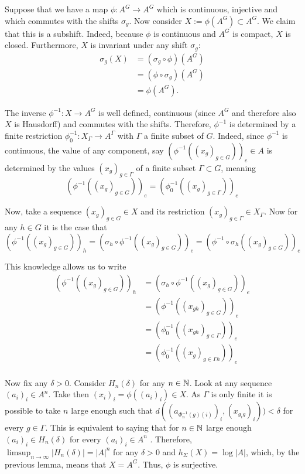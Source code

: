 Suppose that we have a map $\phi: A^G \to A^G$ which is continuous, injective and which commutes with the shifts $\sigma_g$. Now consider $X := \phi(A^G) \subset A^G$. We claim that this is a subshift. Indeed, because $\phi$ is continuous and $A^G$ is compact, $X$ is closed. Furthermore, $X$ is invariant under any shift $\sigma_g$: 
		\begin{align*}
		\sigma_g(X)
		&= (\sigma_g \circ \phi) (A^G) \\
		&= (\phi \circ \sigma_g)(A^G) \\
		&= \phi(A^G).
		\end{align*}
		
The inverse $\phi^{-1}: X \to A^G$ is well defined, continuous (since $A^G$ and therefore also $X$ is Hausdorff) and commutes with the shifts. Therefore,  $\phi^{-1}$ is determined by a finite restriction $\phi^{-1}_0: X_{\Gamma} \to A^{\Gamma}$ with $\Gamma$ a finite subset of $G$. Indeed, since $\phi^{-1}$ is continuous, the value of any component, say $(\phi^{-1}((x_g)_{g \in G}))_e \in A$ is determined by the values $(x_g)_{g \in \Gamma}$ of a finite subset $\Gamma \subset G$, meaning 
		\[
		(\phi^{-1}((x_g)_{g \in G}))_e = (\phi^{-1}_0((x_g)_{g \in \Gamma}))_e
		\]

Now, take a sequence $(x_g)_{g \in G} \in X$ and its restriction $(x_g)_{g \in \Gamma} \in X_{\Gamma}$. Now for any $h \in G$ it is the case that 
		\[
		(\phi^{-1}((x_g)_{g \in G}))_h = (\sigma_h \circ \phi^{-1}((x_g)_{g \in G}))_e  = (\phi^{-1} \circ \sigma_h((x_g)_{g \in G}))_e
		\]

This knowledge allows us to write
		\begin{align*}
		(\phi^{-1}((x_g)_{g \in G}))_h
		&= (\sigma_h \circ \phi^{-1}((x_g)_{g \in G}))_e \\
		&= (\phi^{-1}((x_{gh})_{g \in G}))_e \\
		&= (\phi^{-1}_0((x_{gh})_{g \in \Gamma}))_e \\
		&= (\phi^{-1}_0((x_g)_{g \in \Gamma h}))_e
		\end{align*}
\\
Now fix any $\delta > 0$. Consider $H_n(\delta)$ for any $n \in \mathbb{N}$. Look at any sequence $(a_i)_i \in A^n$. Take then $(x_i)_i = \phi((a_i)_i) \in X$. As $\Gamma$ is only finite it is possible to take $n$ large enough such that $d((a_{\Phi^{-1}_n(g)(i)})_i,(x_{g_i g})_i)) < \delta$ for every $g \in \Gamma$. This is equivalent to saying that for $n \in \mathbb{N}$ large enough $(a_i)_i \in H_n(\delta)$ for every $(a_i)_i \in A^n$ . Therefore, $\limsup_{n \to \infty} |H_n(\delta)| = |A|^{n}$ for any $\delta >0$ and $h_\Sigma(X) = \log |A|$, which, by the previous lemma, means that $X = A^G$. Thus, $\phi$ is surjective.

